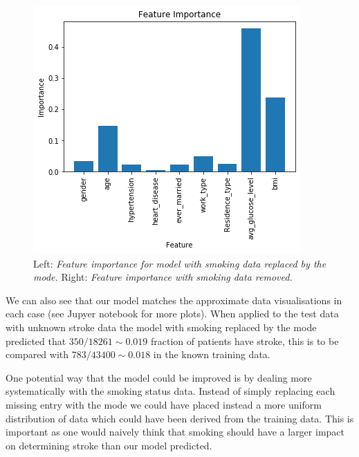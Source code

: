 \documentclass[10pt]{article}
\begin{document}
\begin{figure}[h!]
\begin{minipage}[b]{0.45\textwidth}
    \includegraphics[width=\textwidth]{index5.png}
  \end{minipage}
\caption{Left: \textit{Feature importance for model with smoking data replaced by the mode.} Right: \textit{Feature importance with smoking data removed.}}
\label{fig3}
\end{figure}
We can also see that our model matches the approximate data visualisations in each case (see Jupyer notebook for more plots).
When applied to the test data with unknown stroke data the model with smoking replaced by the mode predicted that $350/18261\sim0.019$ fraction of patients have stroke, this is to be compared with $783/43400\sim0.018$ in the known training data.

One potential way that the model could be improved is by dealing more systematically with the smoking status data. Instead of simply replacing each missing entry with the mode we could have placed instead a more uniform distribution of data which could have been derived from the training data. This is important as one would naively think that smoking should have a larger impact on determining stroke than our model predicted.
\end{document}
